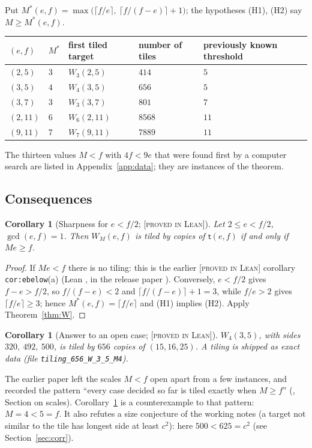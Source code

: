 \documentclass[11pt,reqno]{amsart}
\theoremstyle{plain}
\newtheorem{corollary}[theorem]{Corollary}
\theoremstyle{definition}
\newcommand{\lab}[1]{\textup{[\textsc{#1}]}}
\newcommand{\PL}{\lab{proved in Lean}}
\newcommand{\tile}{\mathsf{t}}
\begin{document}
\medskip
Put $M^*(e,f)=\max\bigl(\lceil f/e\rceil,\ \lceil f/(f-e)\rceil+1\bigr)$; the hypotheses (H1), (H2) say $M\ge M^*(e,f)$.
\begin{center}\small
\begin{tabular}{@{}lllll@{}}
\toprule
$(e,f)$ & $M^*$ & first tiled target & number of tiles & previously known threshold\\
\midrule
$(2,5)$ & $3$ & $W_3(2,5)$ & $414$ & $5$\\
$(3,5)$ & $4$ & $W_4(3,5)$ & $656$ & $5$\\
$(3,7)$ & $3$ & $W_3(3,7)$ & $801$ & $7$\\
$(2,11)$ & $6$ & $W_6(2,11)$ & $8568$ & $11$\\
$(9,11)$ & $7$ & $W_7(9,11)$ & $7889$ & $11$\\
\bottomrule
\end{tabular}
\end{center}
The thirteen values $M<f$ with $4f<9e$ that were found first by a computer search are listed in Appendix~\ref{app:data}; they are instances of the theorem.

\subsection{Consequences}
\begin{corollary}[Sharpness for $e<f/2$; \PL{}]\label{cor:sharp}
Let $2\le e<f/2$, $\gcd(e,f)=1$. Then $W_M(e,f)$ is tiled by copies of $\tile(e,f)$ if and only if $Me\ge f$.
\end{corollary}
\begin{proof}
If $Me<f$ there is no tiling: this is the earlier \PL{} corollary \texttt{cor:ebelow}(a) (Lean , in the release paper \cite{ReleasePaper}).
Conversely, $e<f/2$ gives $f-e>f/2$, so $f/(f-e)<2$ and $\lceil f/(f-e)\rceil+1=3$, while $f/e>2$ gives $\lceil f/e\rceil\ge3$; hence $M^*(e,f)=\lceil f/e\rceil$ and (H1) implies (H2). Apply Theorem~\ref{thm:W}.
\end{proof}
\begin{corollary}[Answer to an open case; \PL{}]\label{cor:W435}
$W_4(3,5)$, with sides $320,\ 492,\ 500$, is tiled by $656$ copies of $(15,16,25)$. A tiling is shipped as exact data (file \texttt{tiling\_656\_W\_3\_5\_M4}).
\end{corollary}
\noindent The earlier paper left the scales $M<f$ open apart from a few instances, and recorded the pattern ``every case decided so far is tiled exactly when $M\ge f$'' (\cite{ReleasePaper}, Section on scales).
Corollary~\ref{cor:W435} is a counterexample to that pattern: $M=4<5=f$.
It also refutes a size conjecture of the working notes (a target not similar to the tile has longest side at least $c^2$): here $500<625=c^2$ (see Section~\ref{sec:corr}).
\end{document}
